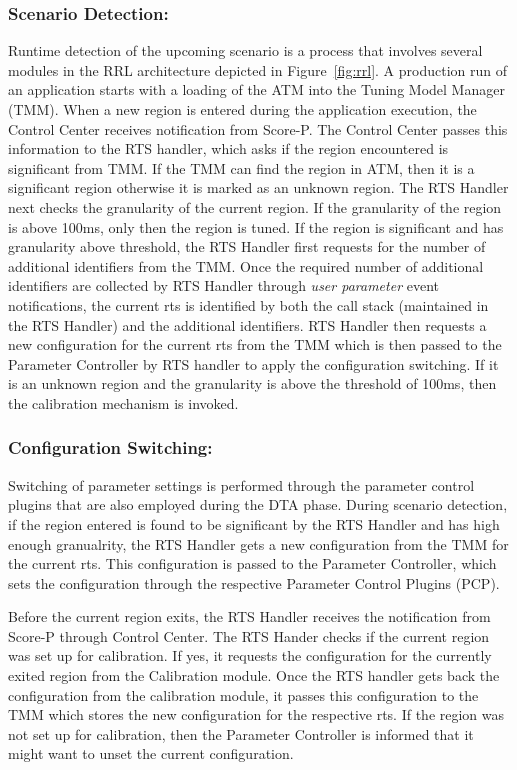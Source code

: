 \subsubsection{Scenario Detection:} Runtime detection of the upcoming scenario is a process that involves several modules in
the RRL architecture depicted in Figure~\ref{fig:rrl}. A production run of an application starts with a loading of the ATM into the Tuning Model Manager (TMM). When a new region is entered during the application execution, the Control Center receives notification from Score-P. The Control Center passes this information to the RTS handler, which asks if the region encountered is significant from TMM. If the TMM can find the region in ATM, then it is a significant region otherwise it is marked as an unknown region. The RTS Handler next checks the granularity of the current region. If the granularity of the region is above 100ms, only then the region is tuned. If the region is significant and has granularity above threshold, the RTS Handler first requests for the number of additional identifiers from the TMM. Once the required number of additional identifiers are collected by RTS Handler through \textit{user parameter} event notifications, the current rts is identified by both the call stack (maintained in the RTS Handler) and the additional identifiers.
RTS Handler then requests a new configuration for the current rts from the TMM which is then passed to the Parameter Controller by RTS handler to apply the configuration switching.  
If it is an unknown region and the granularity is above the threshold of 100ms, then the calibration mechanism is invoked.

\subsubsection{Configuration Switching:} Switching of parameter settings is performed through the parameter control plugins that are also employed during the DTA phase.
During scenario detection, if the region entered is found to be significant by the RTS Handler and has high enough granualrity, the RTS Handler gets a new configuration from the TMM for the current rts. 
This configuration is passed to the Parameter Controller, which sets the configuration through the respective Parameter Control Plugins (PCP).

Before the current region exits, the RTS Handler receives the notification  from Score-P through Control Center. 
The RTS Hander checks if the current region was set up for calibration. If yes, it requests the configuration for the currently exited region from the
Calibration module. Once the RTS handler gets back the configuration from the calibration module, it passes this configuration to the TMM which stores the new configuration for the respective rts. If the region was not set up for calibration, then the Parameter Controller is informed that it might want to unset the current configuration. 

